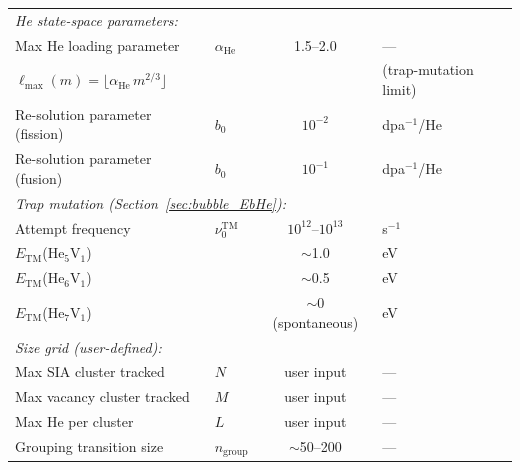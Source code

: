 \documentclass[pdflatex,sn-basic]{sn-jnl} %
\begin{document}
\begin{table}[htbp]
\begin{tabular}{@{}llcl@{}}
\multicolumn{4}{l}{\emph{He state-space parameters:}} \\
Max He loading parameter & $\alpha_{\mathrm{He}}$ & 1.5--2.0 & --- \\
$\ell_{\max}(m) = \lfloor\alpha_{\mathrm{He}}\,m^{2/3}\rfloor$
  & & & (trap-mutation limit) \\
Re-solution parameter (fission) & $b_0$ & $10^{-2}$ & dpa$^{-1}$/He \\
Re-solution parameter (fusion) & $b_0$ & $10^{-1}$ & dpa$^{-1}$/He \\[4pt]

\multicolumn{4}{l}{\emph{Trap mutation (Section~\ref{sec:bubble_EbHe}):}} \\
Attempt frequency & $\nu_0^{\mathrm{TM}}$ & $10^{12}$--$10^{13}$ & s$^{-1}$ \\
$E_{\mathrm{TM}}$(He$_5$V$_1$) & & $\sim$1.0 & eV \\
$E_{\mathrm{TM}}$(He$_6$V$_1$) & & $\sim$0.5 & eV \\
$E_{\mathrm{TM}}$(He$_7$V$_1$) & & $\sim$0 (spontaneous) & eV \\[4pt]

\multicolumn{4}{l}{\emph{Size grid (user-defined):}} \\
Max SIA cluster tracked & $N$ & user input & --- \\
Max vacancy cluster tracked & $M$ & user input & --- \\
Max He per cluster & $L$ & user input & --- \\
Grouping transition size & $n_{\mathrm{group}}$ & $\sim$50--200 & --- \\
\bottomrule
\end{tabular}
\end{table}
\end{document}
